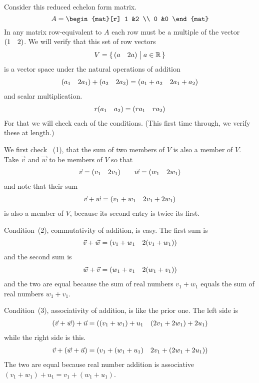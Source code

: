 \documentclass[10pt,t,serif,professionalfont]{beamer}
\begin{document}
\begin{frame}
\ex
Consider this reduced echelon form matrix.
\begin{equation*}
  A=\begin{mat}[r]
    1  &2  \\
    0  &0  
  \end{mat}
\end{equation*}
In any matrix row-equivalent to $A$ each row must be a multiple of
the vector $(\begin{matrix} 1  &2 \end{matrix})$.
We will verify that this set of row vectors
\begin{equation*}
  V=\mbox{$\{\,(\begin{matrix} a  &2a \end{matrix})\bigm| a\in\mathbb{R}\,\}$}
\end{equation*}
is a vector space under the natural operations of addition
\begin{equation*}
  (\begin{matrix} a_1 &2a_1 \end{matrix})+(\begin{matrix} a_2 &2a_2 \end{matrix})
  =
  (\begin{matrix} a_1+a_2 &2a_1+a_2 \end{matrix})
\end{equation*}
and scalar multiplication.
\begin{equation*}
  r(\begin{matrix} a_1 &a_2 \end{matrix})
  =
  (\begin{matrix} ra_1 &ra_2 \end{matrix})
\end{equation*}
For that we will check each of the conditions.
(This first time through, we verify these at length.)
\end{frame}\begin{frame}
We first check ~(1),
that the sum of two members of $V$
is also a member of $V$.
Take $\vec{v}$ and  $\vec{w}$ to be members of $V$ so that
\begin{equation*}
  \vec{v}=(\begin{matrix} v_1 &2v_1 \end{matrix})
  \qquad
  \vec{w}=(\begin{matrix} w_1 &2w_1 \end{matrix})  
\end{equation*}
and note that their sum
\begin{equation*}
  \vec{v}+\vec{w}=
  (\begin{matrix} v_1+w_1 &2v_1+2w_1 \end{matrix})
\end{equation*} 
is also a member of $V$, because its second entry is twice its first.

\pause
Condition~(2), commutativity of addition, is easy.
The first sum is 
\begin{equation*}
  \vec{v}+\vec{w}=(\begin{matrix} v_1+w_1 &2(v_1+w_1) \end{matrix})
\end{equation*}
and the second sum is
\begin{equation*}
  \vec{w}+\vec{v}
  =
  (\begin{matrix} w_1+v_1 &2(w_1+v_1) \end{matrix})  
\end{equation*}
and the two are equal because the sum of real numbers
$v_1+w_1$ equals the sum of real numbers $w_1+v_1$.
\end{frame}\begin{frame}
Condition~(3), associativity of addition, is like the prior one.
The left side is 
\begin{equation*}
  (\vec{v}+\vec{w})+\vec{u}=(\begin{matrix} (v_1+w_1)+u_1 &(2v_1+2w_1)+2u_1 \end{matrix})
\end{equation*}
while the right side is this.
\begin{equation*}
  \vec{v}+(\vec{w}+\vec{u})
  =
  (\begin{matrix} v_1+(w_1+u_1) &2v_1+(2w_1+2u_1) \end{matrix})  
\end{equation*}
The two are equal because real number addition is associative 
$(v_1+w_1)+u_1=v_1+(w_1+u_1)$.


\end{frame}
\end{document}
